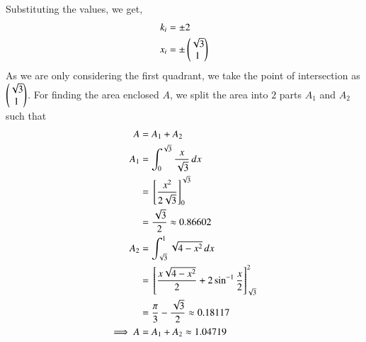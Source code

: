 \documentclass[journal]{IEEEtran}
\begin{document}
Substituting the values, we get,
\begin{align}
    k_i &= \pm 2\\
    x_i &= \pm \begin{pmatrix}\sqrt{3}\\1\end{pmatrix}
\end{align}
As we are only considering the first quadrant, we take the point of intersection as $\begin{pmatrix}\sqrt{3}\\1\end{pmatrix}$.
\newline
For finding the area enclosed $A$, we split the area into $2$ parts $A_1$ and $A_2$ such that
\begin{align}
    A &= A_1 + A_2\\
    A_1 &= \int_{0}^{\sqrt{3}} \frac{x}{\sqrt{3}} \, dx\\
        &= {}\left[\frac{x^2}{2\sqrt{3}}\right]_{0}^{\sqrt{3}}\\
        &= \frac{\sqrt{3}}{2} \approx 0.86602\\
    A_2 &= \int_{\sqrt{3}}^{1} \sqrt{4 - x^2} \, dx\\
        &= {}\left[\frac{x\sqrt{4 - x^2}}{2} + 2\sin^{-1}{\frac{x}{2}}\right]_{\sqrt{3}}^{2}\\
        &= \frac{\pi}{3} - \frac{\sqrt{3}}{2} \approx 0.18117\\
    \implies A &= A_1 + A_2 \approx 1.04719
\end{align}
\end{document}
